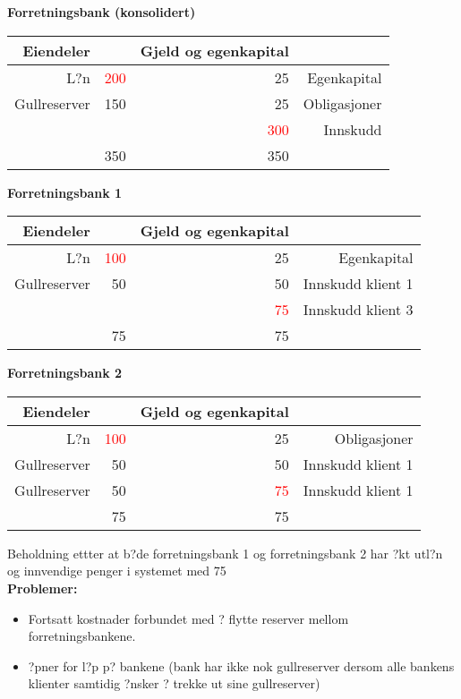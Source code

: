 \documentclass[a4paper,notitlepage]{article}
\begin{document}
\textbf{Forretningsbank (konsolidert)}
\begin{center}\begin{tabular}{rlrr}
    \textbf{Eiendeler} & \textbf{} & \textbf{Gjeld og egenkapital} & \textbf{} \\
\hline    L?n   & \textcolor{red}{200}    & 25    & Egenkapital \\
    Gullreserver  &  150   & 25    & Obligasjoner \\
          &       & \textcolor{red}{300}    & Innskudd \\
\hline          & 350   & 350   &  \\
\end{tabular}%
\end{center}
\noindent \textbf{Forretningsbank 1}
\begin{center}
\begin{tabular}{rrrr}
    \textbf{Eiendeler} & \textbf{} & \textbf{Gjeld og egenkapital} & \textbf{} \\
\hline    L?n   & \textcolor{red}{100}    & 25    & Egenkapital \\
    Gullreserver & 50    & 50    & Innskudd klient 1 \\
  &     & \textcolor{red}{75}    & Innskudd klient 3 \\

\hline          & 75    & 75    &  \\
\end{tabular}%
\end{center}
\noindent \textbf{Forretningsbank 2}
\begin{center}

\begin{tabular}{rrrr}
    \textbf{Eiendeler} & \textbf{} & \textbf{Gjeld og egenkapital} & \textbf{} \\
\hline    L?n   &\textcolor{red}{100}   & 25    & Obligasjoner \\
    Gullreserver & 50    & 50    & Innskudd klient 1 \\
    Gullreserver & 50    & \textcolor{red}{75}    & Innskudd klient 1 \\
\hline          & 75    & 75    &  \\
\end{tabular}%
\end{center}
Beholdning ettter at b?de forretningsbank 1 og forretningsbank 2 har ?kt utl?n og innvendige penger i systemet med 75
\noindent\textbf{\\ Problemer:}\\
\begin{itemize}
\item Fortsatt kostnader forbundet med ? flytte reserver mellom forretningsbankene.
\item ?pner for l?p p? bankene (bank har ikke nok gullreserver dersom alle bankens klienter samtidig ?nsker ? trekke ut sine gullreserver)          \end{itemize}
\end{document}
